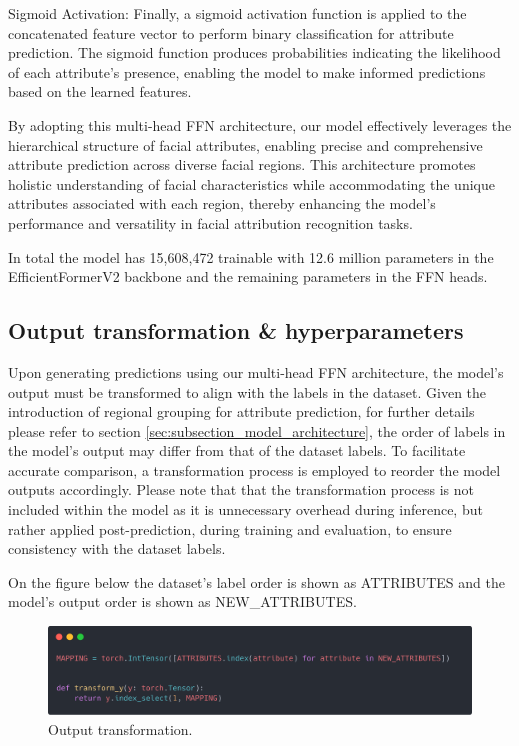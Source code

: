 \documentclass[a4paper,oneside]{article}
\begin{document}
Sigmoid Activation: Finally, a sigmoid activation function is applied to the concatenated feature vector to perform binary classification for attribute prediction.
The sigmoid function produces probabilities indicating the likelihood of each attribute's presence, enabling the model to make informed predictions based on the learned features.

By adopting this multi-head FFN architecture, our model effectively leverages the hierarchical structure of facial attributes, enabling precise and comprehensive attribute prediction across diverse facial regions.
This architecture promotes holistic understanding of facial characteristics while accommodating the unique attributes associated with each region, thereby enhancing the model's performance and versatility in facial attribution recognition tasks.

In total the model has 15,608,472 trainable with 12.6 million parameters in the EfficientFormerV2 backbone and the remaining parameters in the FFN heads.

\subsection{Output transformation \& hyperparameters}
\label{sec:subsection_output_transformation}

Upon generating predictions using our multi-head FFN architecture, the model's output must be transformed to align with the labels in the dataset.
Given the introduction of regional grouping for attribute prediction, for further details please refer to section \ref{sec:subsection_model_architecture}, the order of labels in the model's output may differ from that of the dataset labels.
To facilitate accurate comparison, a transformation process is employed to reorder the model outputs accordingly.
Please note that that the transformation process is not included within the model as it is unnecessary overhead during inference, but rather applied post-prediction, during training and evaluation, to ensure consistency with the dataset labels.

On the figure below the dataset's label order is shown as ATTRIBUTES and the model's output order is shown as NEW\_ATTRIBUTES.

\begin{figure}[h]
  \includegraphics[width=\textwidth]{OutputTransformation.png}
  \centering
  \caption{Output transformation.}
  \centering
\end{figure}
\end{document}
